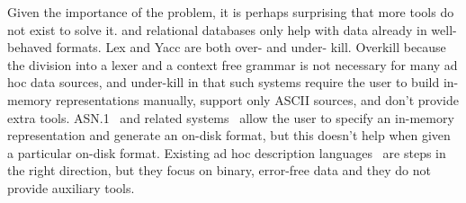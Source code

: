 \documentclass[11pt]{article}
\begin{document}
Given the importance of the problem, it is perhaps surprising that
more tools do not exist to solve it.  \xml{} and relational databases
only help with data already in well-behaved formats.  Lex and Yacc are
both over- and under- kill.  Overkill because the division into a
lexer and a context free grammar is not necessary for many ad hoc data
sources, and under-kill in that such systems require the user to build
in-memory representations manually, support only ASCII sources, and
don't provide extra tools.  ASN.1~\cite{asn} and related
systems~\cite{asdl} allow the user to specify an in-memory
representation and generate an on-disk format, but this doesn't help
when given a particular on-disk format.  Existing ad hoc description
languages~\cite{gpce02,sigcomm00,erlang} are steps in the right
direction, but they focus on binary, error-free data and they do not
provide auxiliary tools.



\end{document}
